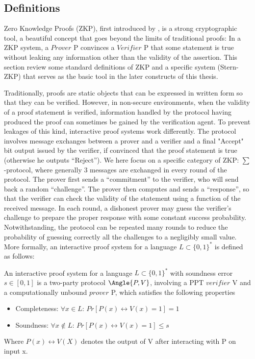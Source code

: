 \subsection{Definitions}
\label{sec:zkpdefinitions}
Zero Knowledge Proofs (ZKP), first introduced by \cite{goldwasser1989knowledge},
is a strong cryptographic tool, a beautiful concept that goes beyond the limits
of traditional proofs: In a ZKP system, a $Prover$ P convinces a $Verifier$ P
that some statement is true without leaking any information other than the validity of the
assertion. This section review some standard definitions of ZKP and a specific
system (Stern-ZKP) that serves as the basic tool in the later constructs of
this thesis.

Traditionally, proofs are static objects that can be expressed in written
form so that they can be verified. However, in non-secure environments, when the
validity of a proof statement is verified, information handled by the protocol having produced the proof can sometimes be gained by the verification agent. To prevent leakages of this kind, interactive proof systems work differently. The protocol involves message exchanges between a prover and a verifier and a final "Accept" bit output issued by the verifier, if convinced that the proof statement is true (otherwise he outputs ``Reject''). We here focus on a specific category of ZKP: \(\sum\)-protocol, where generally 3 messages are exchanged in every round of the protocol. The prover first
sends a ``commitment'' to the verifier, who will send back a random
``challenge''. The prover then computes and sends a ``response'', so that the
verifier can check the validity of the statement using a function of the received
message. In each round, a dishonest prover may guess the verifier's
challenge to prepare the proper response with some constant success
probability. Notwithstanding, the protocol can be repeated many rounds to reduce the
probability of guessing correctly all the challenges to a negligibly small value.  More
formally, an interactive proof system for a language \(L \subset \{0,1\}^{*}\)
is defined as follows:

\begin{definition}
   An interactive proof system for a language
  \(L \subset \{0,1\}^{*}\) with soundness error \(s \in [0,1]\) is a two-party
  protocol \(\Angle{P,V}\), involving a PPT \(verifier \) V and a computationally
  unbound \(prover \) P, which satisfies the following properties
  \begin{itemize}
  \item Completeness: \(\forall x \in L\): \(Pr[P(x) \leftrightarrow V(x) = 1] = 1\)
  \item Soundness: \(\forall x \notin L\): \(Pr[P(x) \leftrightarrow V(x) = 1] \leq s\)
  \end{itemize}
\end{definition}
Where \(P(x) \leftrightarrow V(X)\) denotes the output of V after interacting
with P on input x.

